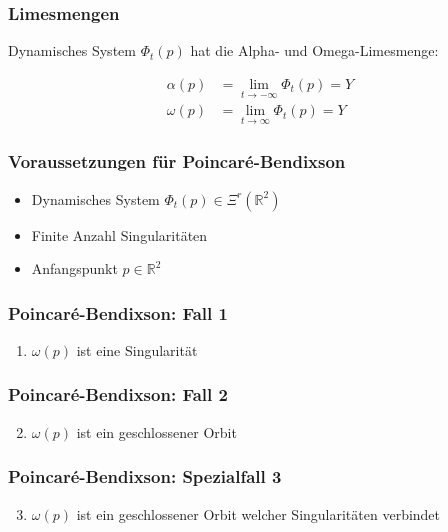 \documentclass[ngerman, aspectratio=169]{beamer}
\begin{document}
    \begin{frame}
    \frametitle{Limesmengen}
        Dynamisches System $\Phi_t(p)$ hat die Alpha- und Omega-Limesmenge:

        \begin{align*}
            \alpha(p) &= \lim_{t\to-\infty} \Phi_t(p) = Y \\
            \omega(p) &= \lim_{t\to\infty} \Phi_t(p) = Y
        \end{align*}
    \end{frame}
    \begin{frame}
    \frametitle{Voraussetzungen für Poincaré-Bendixson}
        \begin{itemize}
            \item Dynamisches System $\Phi_t(p) \in \Xi^r(\mathbb{R}^2)$
            \item Finite Anzahl Singularitäten
            \item Anfangspunkt $p \in \mathbb{R}^2$
        \end{itemize}
    \end{frame}
    \begin{frame}
    \frametitle{Poincaré-Bendixson: Fall 1}
        \begin{enumerate}
            \item $\omega(p)$ ist eine Singularität
        \end{enumerate}
        \begin{center}
            
        \end{center}
    \end{frame}
    \begin{frame}
    \frametitle{Poincaré-Bendixson: Fall 2}
        \begin{enumerate}
            \setcounter{enumi}{1}
            \item $\omega(p)$ ist ein geschlossener Orbit
        \end{enumerate}
        \begin{center}
            
        \end{center}
    \end{frame}
    \begin{frame}
    \frametitle{Poincaré-Bendixson: Spezialfall 3}
        \begin{enumerate}
            \setcounter{enumi}{2}
            \item $\omega(p)$ ist ein geschlossener Orbit welcher Singularitäten verbindet
        \end{enumerate}
    \end{frame}
\end{document}
